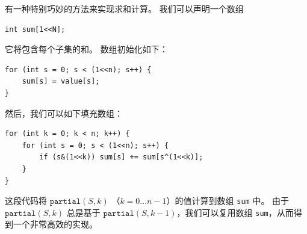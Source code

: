 有一种特别巧妙的方法来实现求和计算。
我们可以声明一个数组
\begin{lstlisting}
int sum[1<<N];
\end{lstlisting}
它将包含每个子集的和。
数组初始化如下：
\begin{lstlisting}
for (int s = 0; s < (1<<n); s++) {
    sum[s] = value[s];
}
\end{lstlisting}
然后，我们可以如下填充数组：
\begin{lstlisting}
for (int k = 0; k < n; k++) {
    for (int s = 0; s < (1<<n); s++) {
        if (s&(1<<k)) sum[s] += sum[s^(1<<k)];
    }
}
\end{lstlisting}
这段代码将 $\texttt{partial}(S,k)$
（$k=0 \ldots n-1$）的值计算到数组 \texttt{sum} 中。
由于 $\texttt{partial}(S,k)$ 总是基于
$\texttt{partial}(S,k-1)$，我们可以复用数组
\texttt{sum}，从而得到一个非常高效的实现。